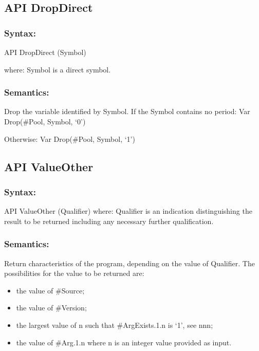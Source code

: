 \subsection{API DropDirect}\label{api-dropdirect}

\subsubsection{Syntax:}\label{syntax-55}

API DropDirect (Symbol)

where: Symbol is a direct symbol.

\subsubsection{Semantics:}\label{semantics-56}

Drop the variable identified by Symbol. If the Symbol contains no
period: Var Drop(\#Pool, Symbol, `0')

Otherwise: Var Drop(\#Pool, Symbol, `1')

\subsection{API ValueOther}\label{api-valueother}

\subsubsection{Syntax:}\label{syntax-56}

API ValueOther (Qualifier) where: Qualifier is an indication
distinguishing the result to be returned including any necessary further
qualification.

\subsubsection{Semantics:}\label{semantics-57}

Return characteristics of the program, depending on the value of
Qualifier. The possibilities for the value to be returned are:

\begin{itemize}
\item
  the value of \#Source;
\item
  the value of \#Version;
\item
  the largest value of n such that \#ArgExists.1.n is `1', see nnn;
\item
  the value of \#Arg.1.n where n is an integer value provided as input.
\end{itemize}


